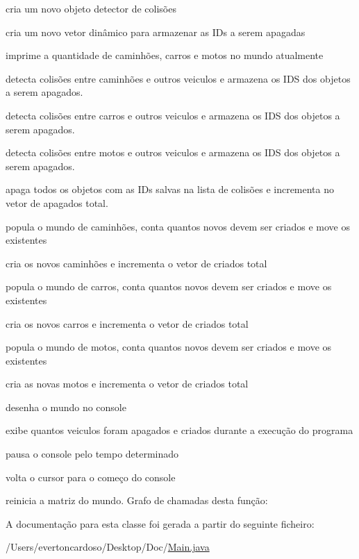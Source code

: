 cria um novo objeto detector de colisões

cria um novo vetor dinâmico para armazenar as I\+Ds a serem apagadas

imprime a quantidade de caminhões, carros e motos no mundo atualmente

detecta colisões entre caminhões e outros veiculos e armazena os I\+DS dos objetos a serem apagados.

detecta colisões entre carros e outros veiculos e armazena os I\+DS dos objetos a serem apagados.

detecta colisões entre motos e outros veiculos e armazena os I\+DS dos objetos a serem apagados.

apaga todos os objetos com as I\+Ds salvas na lista de colisões e incrementa no vetor de apagados total.

popula o mundo de caminhões, conta quantos novos devem ser criados e move os existentes

cria os novos caminhões e incrementa o vetor de criados total

popula o mundo de carros, conta quantos novos devem ser criados e move os existentes

cria os novos carros e incrementa o vetor de criados total

popula o mundo de motos, conta quantos novos devem ser criados e move os existentes

cria as novas motos e incrementa o vetor de criados total

desenha o mundo no console

exibe quantos veiculos foram apagados e criados durante a execução do programa

pausa o console pelo tempo determinado

volta o cursor para o começo do console

reinicia a matriz do mundo. Grafo de chamadas desta função\+:


A documentação para esta classe foi gerada a partir do seguinte ficheiro\+:\begin{DoxyCompactItemize}
\item 
/\+Users/evertoncardoso/\+Desktop/\+Doc/\mbox{\hyperlink{_main_8java}{Main.\+java}}\end{DoxyCompactItemize}
